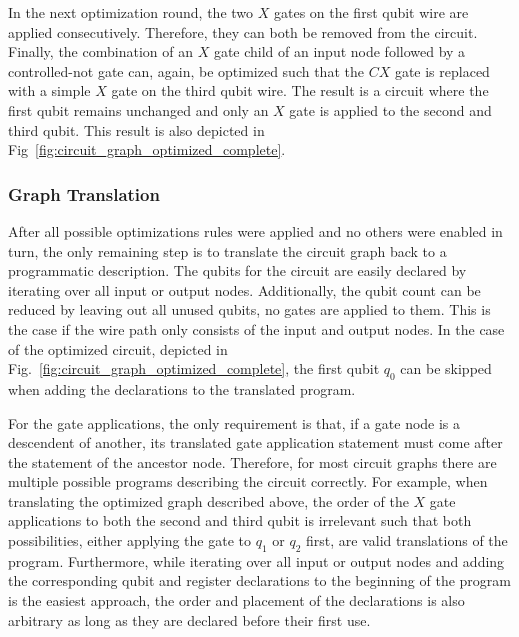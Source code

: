 In the next optimization round, the two $X$ gates on the first qubit wire are applied consecutively. Therefore, they can both be removed from the circuit. Finally, the combination of an $X$ gate child of an input node followed by a controlled-not gate can, again, be optimized such that the $CX$ gate is replaced with a simple $X$ gate on the third qubit wire. The result is a circuit where the first qubit remains unchanged and only an $X$ gate is applied to the second and third qubit. This result is also depicted in Fig~\ref{fig:circuit_graph_optimized_complete}. 

\subsubsection{Graph Translation}
After all possible optimizations rules were applied and no others were enabled in turn, the only remaining step is to translate the circuit graph back to a programmatic description. The qubits for the circuit are easily declared by iterating over all input or output nodes. Additionally, the qubit count can be reduced by leaving out all unused qubits, \ie no gates are applied to them. This is the case if the wire path only consists of the input and output nodes. In the case of the optimized circuit, depicted in Fig.~\ref{fig:circuit_graph_optimized_complete}, the first qubit $q_0$ can be skipped when adding the declarations to the translated program. 

For the gate applications, the only requirement is that, if a gate node is a descendent of another, its translated gate application statement must come after the statement of the ancestor node. Therefore, for most circuit graphs there are multiple possible programs describing the circuit correctly. For example, when translating the optimized graph described above, the order of the $X$ gate applications to both the second and third qubit is irrelevant such that both possibilities, \ie either applying the gate to $q_1$ or $q_2$ first, are valid translations of the program. Furthermore, while iterating over all input or output nodes and adding the corresponding qubit and register declarations to the beginning of the program is the easiest approach, the order and placement of the declarations is also arbitrary as long as they are declared before their first use. 

